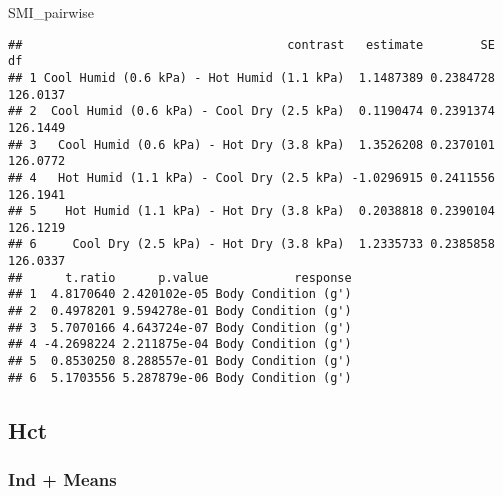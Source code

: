 \documentclass[
]{article}
\newenvironment{Shaded}{\begin{snugshade}}{\end{snugshade}}
\newcommand{\NormalTok}[1]{#1}
\begin{document}
\begin{Shaded}
\begin{Highlighting}[]
\NormalTok{SMI\_pairwise}
\end{Highlighting}
\end{Shaded}

\begin{verbatim}
##                                     contrast   estimate        SE       df
## 1 Cool Humid (0.6 kPa) - Hot Humid (1.1 kPa)  1.1487389 0.2384728 126.0137
## 2  Cool Humid (0.6 kPa) - Cool Dry (2.5 kPa)  0.1190474 0.2391374 126.1449
## 3   Cool Humid (0.6 kPa) - Hot Dry (3.8 kPa)  1.3526208 0.2370101 126.0772
## 4   Hot Humid (1.1 kPa) - Cool Dry (2.5 kPa) -1.0296915 0.2411556 126.1941
## 5    Hot Humid (1.1 kPa) - Hot Dry (3.8 kPa)  0.2038818 0.2390104 126.1219
## 6     Cool Dry (2.5 kPa) - Hot Dry (3.8 kPa)  1.2335733 0.2385858 126.0337
##      t.ratio      p.value            response
## 1  4.8170640 2.420102e-05 Body Condition (g')
## 2  0.4978201 9.594278e-01 Body Condition (g')
## 3  5.7070166 4.643724e-07 Body Condition (g')
## 4 -4.2698224 2.211875e-04 Body Condition (g')
## 5  0.8530250 8.288557e-01 Body Condition (g')
## 6  5.1703556 5.287879e-06 Body Condition (g')
\end{verbatim}

\hypertarget{hct}{%
\subsection{Hct}\label{hct}}

\hypertarget{ind-means-1}{%
\subsubsection{Ind + Means}\label{ind-means-1}}
\end{document}
